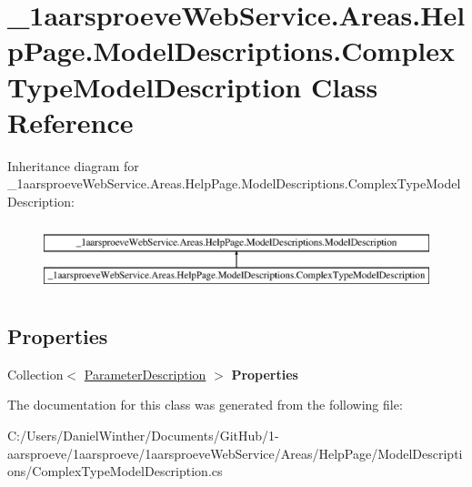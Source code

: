 \hypertarget{class__1aarsproeve_web_service_1_1_areas_1_1_help_page_1_1_model_descriptions_1_1_complex_type_model_description}{}\section{\+\_\+1aarsproeve\+Web\+Service.\+Areas.\+Help\+Page.\+Model\+Descriptions.\+Complex\+Type\+Model\+Description Class Reference}
\label{class__1aarsproeve_web_service_1_1_areas_1_1_help_page_1_1_model_descriptions_1_1_complex_type_model_description}
Inheritance diagram for \+\_\+1aarsproeve\+Web\+Service.\+Areas.\+Help\+Page.\+Model\+Descriptions.\+Complex\+Type\+Model\+Description\+:\begin{figure}[H]
\begin{center}
\leavevmode
\includegraphics[height=2.000000cm]{class__1aarsproeve_web_service_1_1_areas_1_1_help_page_1_1_model_descriptions_1_1_complex_type_model_description}
\end{center}
\end{figure}
\subsection*{Properties}
\begin{DoxyCompactItemize}
\item 
\hypertarget{class__1aarsproeve_web_service_1_1_areas_1_1_help_page_1_1_model_descriptions_1_1_complex_type_model_description_afabdec8e2987c716ec40a6d32410fca9}{}Collection$<$ \hyperlink{class__1aarsproeve_web_service_1_1_areas_1_1_help_page_1_1_model_descriptions_1_1_parameter_description}{Parameter\+Description} $>$ {\bfseries Properties}\label{class__1aarsproeve_web_service_1_1_areas_1_1_help_page_1_1_model_descriptions_1_1_complex_type_model_description_afabdec8e2987c716ec40a6d32410fca9}

\end{DoxyCompactItemize}


The documentation for this class was generated from the following file\+:\begin{DoxyCompactItemize}
\item 
C\+:/\+Users/\+Daniel\+Winther/\+Documents/\+Git\+Hub/1-\/aarsproeve/1aarsproeve/1aarsproeve\+Web\+Service/\+Areas/\+Help\+Page/\+Model\+Descriptions/Complex\+Type\+Model\+Description.\+cs\end{DoxyCompactItemize}
